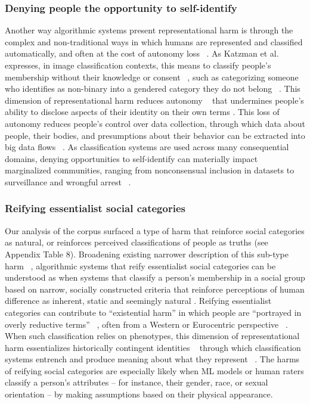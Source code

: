 \subsubsection{Denying people the opportunity to self-identify} 
Another way algorithmic systems present representational harm is through the complex and non-traditional ways in which humans are represented and classified automatically, and often at the cost of autonomy loss ~\cite{Chancellor_2019, Paullada_Raji_Bender_Denton_Hanna_2021}. As Katzman et al. expresses, in image classification contexts, this means to classify people’s membership without their knowledge or consent ~\cite{Katzman_Barocas_Blodgett_Laird_Scheuerman_Wallach_2021}, such as categorizing someone who identifies as non-binary into a gendered category they do not belong ~\cite{Wang_Ramaswamy_Russakovsky_2022}. This dimension of representational harm reduces autonomy ~\cite{Hanna_Denton_Smart_Smith-Loud_2020} that undermines people’s ability to disclose aspects of their identity on their own terms \cite{corry2021problem}. This loss of autonomy reduces people’s control over data collection, through which data about people, their bodies, and presumptions about their behavior can be extracted into big data flows ~\cite{DIgnazio_Klein_2021}. As classification systems are used across many consequential domains, denying opportunities to self-identify can materially impact marginalized communities, ranging from nonconsensual inclusion in datasets to surveillance and wrongful arrest ~\cite{Bennett_Gleason_Scheuerman_Bigham_Guo_To_2021}. 

\subsubsection{Reifying essentialist social categories} 
Our analysis of the corpus surfaced a type of harm that reinforce social categories as natural, or reinforces perceived classifications of people as truths (see Appendix Table 8). Broadening existing narrower description of this sub-type harm ~\cite{Barocas_Guo_Kamar_Krones_Morris_Vaughan_Wadsworth_Wallach_2021, Katzman_Barocas_Blodgett_Laird_Scheuerman_Wallach_2021}, algorithmic systems that reify essentialist social categories can be understood as when systems that classify a person’s membership in a social group based on narrow, socially constructed criteria that reinforce perceptions of human difference as inherent, static and seemingly natural \cite{Keyes_2018, Devinney_2022}.
Reifying essentialist categories can contribute to “existential harm” in which people are “portrayed in overly reductive terms” ~\cite[p. 162]{Sadowski_Selinger_2014}, often from a Western or Eurocentric perspective ~\cite{Devinney_2022}. When such classification relies on phenotypes, this dimension of representational harm essentializes historically contingent identities ~\cite{Field_Blodgett_Waseem_Tsvetkov_2021} through which classification systems entrench and produce meaning about what they represent ~\cite{Hanna_Denton_Smart_Smith-Loud_2020, Hoffmann_2021}. The harms of reifying social categories are especially likely when ML models or human raters classify a person’s attributes – for instance, their gender, race, or sexual orientation – by making assumptions based on their physical appearance.  

